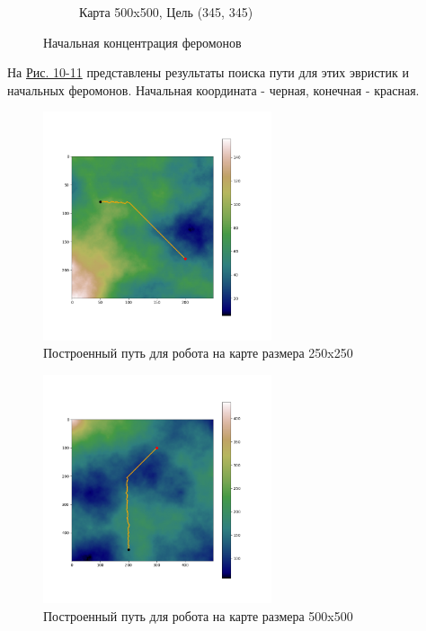 \documentclass{article}
\numberwithin{equation}{section}
\begin{document}
\begin{figure}[H]
\begin{subfigure}[b]{0.49\textwidth}
					\caption*{Карта 500x500, Цель (345, 345)}
				\end{subfigure}
				\caption{Начальная концентрация феромонов}\label{fig:pher}
			\end{figure}

			На \hyperref[fig:rob1]{Рис. 10-11} представлены результаты поиска пути для этих эвристик и начальных феромонов. Начальная координата - черная, конечная - красная.

			\begin{figure}[H]
				\centering
				\vspace{-0.5cm}
				\includegraphics[width=0.6\textwidth]{data/path_example/250x250.png}
				\vspace{-0.5cm}
				\caption{Построенный путь для робота на карте размера 250x250}\label{fig:rob1}
			\end{figure}

			\begin{figure}[H]
				\centering
				\vspace{-0.5cm}
				\includegraphics[width=0.6\textwidth]{data/path_example/500x500.png}
				\vspace{-0.5cm}
				\caption{Построенный путь для робота на карте размера 500x500}\label{fig:rob2}
			\end{figure}
\end{document}
